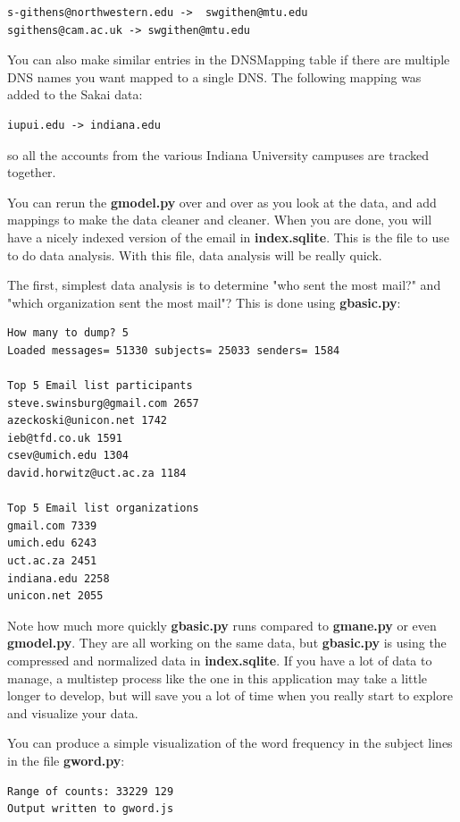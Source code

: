 \beforeverb
\begin{verbatim}
s-githens@northwestern.edu ->  swgithen@mtu.edu
sgithens@cam.ac.uk -> swgithen@mtu.edu
\end{verbatim}
\afterverb
%
You can also make similar entries in the DNSMapping table if there are multiple
DNS names you want mapped to a single DNS.  The following mapping was added to the Sakai data:

\beforeverb
\begin{verbatim}
iupui.edu -> indiana.edu
\end{verbatim}
\afterverb
%
so all the accounts from the various Indiana University campuses are tracked together.

You can rerun the {\bf gmodel.py} over and over as you look at the data, and add mappings
to make the data cleaner and cleaner.   When you are done, you will have a nicely
indexed version of the email in {\bf index.sqlite}.   This is the file to use to do data
analysis.   With this file, data analysis will be really quick.

The first, simplest data analysis is to determine "who sent the most mail?" and "which 
organization sent the most mail"?  This is done using {\bf gbasic.py}:

\beforeverb
\begin{verbatim}
How many to dump? 5
Loaded messages= 51330 subjects= 25033 senders= 1584

Top 5 Email list participants
steve.swinsburg@gmail.com 2657
azeckoski@unicon.net 1742
ieb@tfd.co.uk 1591
csev@umich.edu 1304
david.horwitz@uct.ac.za 1184

Top 5 Email list organizations
gmail.com 7339
umich.edu 6243
uct.ac.za 2451
indiana.edu 2258
unicon.net 2055
\end{verbatim}
\afterverb
%
Note how much more quickly {\bf gbasic.py} runs compared to {\bf gmane.py}
or even {\bf gmodel.py}. They are all working on the same data, but 
{\bf gbasic.py} is using the compressed and normalized data in 
{\bf index.sqlite}.  If you have a lot of data to manage, a multistep
process like the one in this application may take a little longer to develop,
but will save you a lot of time when you really start to explore
and visualize your data.

You can produce a simple visualization of the word frequency in the subject lines
in the file {\bf gword.py}:

\beforeverb
\begin{verbatim}
Range of counts: 33229 129
Output written to gword.js
\end{verbatim}
\afterverb
%

